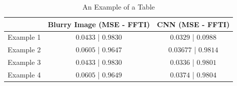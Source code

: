 \documentclass[conference]{IEEEtran}
\begin{document}
\begin{table}[!t]
\renewcommand{\arraystretch}{1.2}
\caption{An Example of a Table}
\label{table_caso_3}
\centering
\begin{tabular}{|c||c||c|}
\hline
 & Blurry Image (MSE - FFTI) & CNN (MSE - FFTI)\\
\hline
Example 1 & $0.0433$ | $0.9830$ & $0.0329$ | $0.0988$\\
\hline
Example 2 & $0.0605$ | $0.9647$ & $0.03677$ | $0.9814$ \\
\hline
Example 3 & $0.0433$ | $0.9830$ & $0.0336$ | $0.9801$\\
\hline
Example 4 & $0.0605$ | $0.9649$ & $0.0374$ | $0.9804$\\ 
\hline
\end{tabular}
\end{table}
\end{document}

